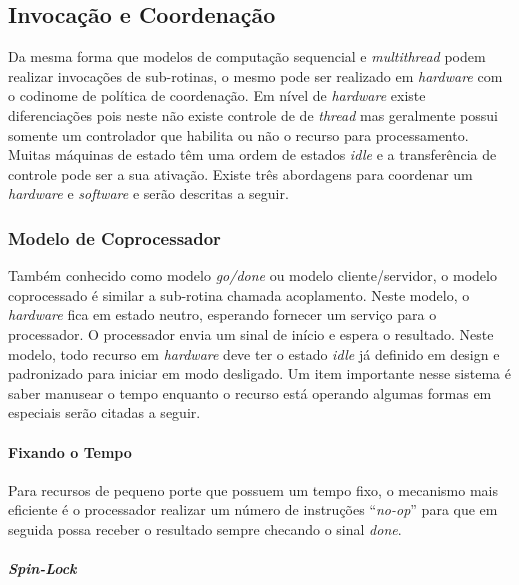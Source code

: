 \subsection{Invocação e Coordenação}

Da mesma forma que modelos de computação sequencial e \textit{multithread} podem realizar invocações de sub-rotinas, o mesmo pode ser realizado em \textit{hardware} com o codinome de política de coordenação. Em nível de \textit{hardware} existe diferenciações pois neste não existe controle de de \textit{thread} mas geralmente possui somente um controlador que habilita ou não o recurso para processamento. Muitas máquinas de estado têm uma ordem de estados \textit{idle} e a transferência de controle pode ser a sua ativação. Existe três abordagens para coordenar um \textit{hardware} e \textit{\textit{software}} e serão descritas a seguir.



\subsubsection{Modelo de Coprocessador}

Também conhecido como modelo \textit{go/done} ou modelo cliente/servidor, o modelo coprocessado é similar a sub-rotina chamada acoplamento. Neste modelo, o \textit{hardware} fica em estado neutro, esperando fornecer um serviço para o processador. O processador envia um sinal de início e espera o resultado. Neste modelo, todo recurso em \textit{hardware} deve ter o estado \textit{idle} já definido em design e padronizado para iniciar em modo desligado. Um item importante nesse sistema é saber manusear o tempo enquanto o recurso está operando algumas formas em especiais serão citadas a seguir.



\paragraph{Fixando o Tempo}

Para recursos de pequeno porte que possuem um tempo fixo, o mecanismo mais eficiente é o processador realizar um número de instruções ``\textit{no-op}'' para que em seguida possa receber o resultado sempre checando o sinal \textit{done}.



\paragraph{\textit{Spin-Lock}}

